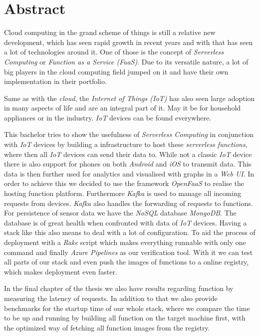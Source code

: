 \section*{Abstract}

Cloud computing in the grand scheme of things is still a relative new development, which has seen
rapid growth in recent years and with that has seen a lot of technologies around it. One of those is
the concept of \textit{Serverless Computing} or \textit{Function as a Service (FaaS)}. Due to its
versatile nature, a lot of big players in the cloud computing field jumped on it and have their own
implementation in their portfolio.

Same as with the \textit{cloud}, the \textit{Internet of Things (IoT)} has also seen large adoption
in many aspects of life and are an integral part of it. May it be for household appliances or in the
industry. \textit{IoT} devices can be found everywhere.

This bachelor tries to show the usefulness of \textit{Serverless Computing} in conjunction with
\textit{IoT} devices by building a infrastructure to host these \textit{serverless functions}, where
then all \textit{IoT} devices can send their data to. While not a classic \textit{IoT} device there
is also support for phones on both \textit{Android} and \textit{iOS} to transmit data. This data is
then further used for analytics and visualised with graphs in a \textit{Web UI}. In order to achieve
this we decided to use the framework \textit{OpenFaaS} to realise the hosting function platform.
Furthermore \textit{Kafka} is used to manage all incoming requests from devices. \textit{Kafka} also
handles the forwarding of requests to functions. For persistence of sensor data we have the
\textit{NoSQL} database \textit{MongoDB}. The database is of great health when confronted with data
of \textit{IoT} devices. Having a stack like this also means to deal with a lot of configuration. To
aid the process of deployment with a \textit{Rake} script which makes everything runnable with only
one command and finally \textit{Azure Pipelines} as our verification tool. With it we can test all
parts of our stack and even push the images of functions to a online registry, which makes
deployment even faster.

In the final chapter of the thesis we also have results regarding function by measuring the latency
of requests. In addition to that we also provide benchmarks for the startup time of our whole stack,
where we compare the time to be up and running by building all function on the target machine first,
with the optimized way of fetching all function images from the registry.
